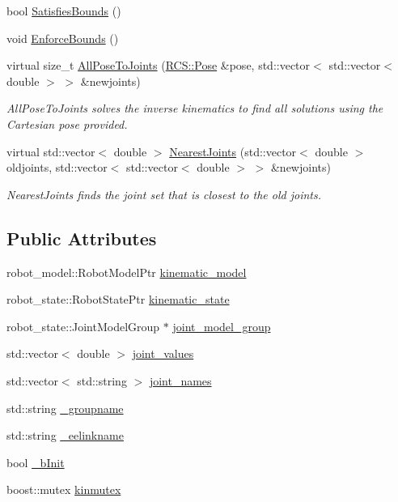 \begin{DoxyCompactItemize}
bool \hyperlink{classRosKinematics_ae51c062c810983b29d418399d38da42f}{Satisfies\-Bounds} ()
\item 
void \hyperlink{classRosKinematics_a19e0993e7e188491918785f4ca6ce115}{Enforce\-Bounds} ()
\item 
virtual size\-\_\-t \hyperlink{classRosKinematics_ae3d78b75e8cbd38a12d451e0e0e95548}{All\-Pose\-To\-Joints} (\hyperlink{namespaceRCS_aa07e45d8a50e30064283d2b38087f999}{R\-C\-S\-::\-Pose} \&pose, std\-::vector$<$ std\-::vector$<$ double $>$ $>$ \&newjoints)
\begin{DoxyCompactList}\small\item\em All\-Pose\-To\-Joints solves the inverse kinematics to find all solutions using the Cartesian pose provided. \end{DoxyCompactList}\item 
virtual std\-::vector$<$ double $>$ \hyperlink{classRosKinematics_ab50d3e7666cf3b2bdb1ae3d5e0a7db8e}{Nearest\-Joints} (std\-::vector$<$ double $>$ oldjoints, std\-::vector$<$ std\-::vector$<$ double $>$ $>$ \&newjoints)
\begin{DoxyCompactList}\small\item\em Nearest\-Joints finds the joint set that is closest to the old joints. \end{DoxyCompactList}\end{DoxyCompactItemize}
\subsection*{Public Attributes}
\begin{DoxyCompactItemize}
\item 
robot\-\_\-model\-::\-Robot\-Model\-Ptr \hyperlink{classRosKinematics_a0ab6cd969d40fa1e40707e8982f76f15}{kinematic\-\_\-model}
\item 
robot\-\_\-state\-::\-Robot\-State\-Ptr \hyperlink{classRosKinematics_a2236796eba89e23f8b47b6fcd87a296d}{kinematic\-\_\-state}
\item 
robot\-\_\-state\-::\-Joint\-Model\-Group $\ast$ \hyperlink{classRosKinematics_ab6f642bac05e91ab8cf0675232e4cf1b}{joint\-\_\-model\-\_\-group}
\item 
std\-::vector$<$ double $>$ \hyperlink{classRosKinematics_af95c3ba0edaccafeb68022895b9824ac}{joint\-\_\-values}
\item 
std\-::vector$<$ std\-::string $>$ \hyperlink{classRosKinematics_a0690908a8ee72e65685dc5b0a0da00df}{joint\-\_\-names}
\item 
std\-::string \hyperlink{classRosKinematics_a80fac3df36e85d02b79c83a35e961f78}{\-\_\-groupname}
\item 
std\-::string \hyperlink{classRosKinematics_ad2aeb76b94edd1bdfb4830eacadebd61}{\-\_\-eelinkname}
\item 
bool \hyperlink{classRosKinematics_a3cae7f7ad57a5df821c2ebf8b55057d5}{\-\_\-b\-Init}
\item 
boost\-::mutex \hyperlink{classRosKinematics_a79f88926f9403d9b90cad26d0fa43193}{kinmutex}
\end{DoxyCompactItemize}


